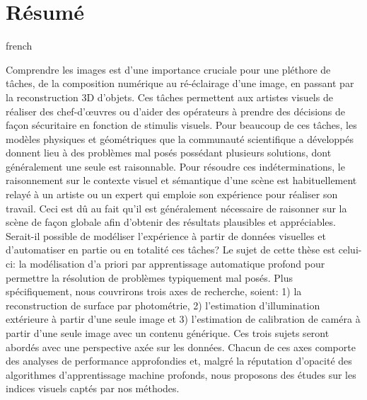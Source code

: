\chapter*{Résumé}                      %

\begin{otherlanguage*}{french}

Comprendre les images est d'une importance cruciale pour une pléthore de tâches, de la composition numérique au ré-éclairage d'une image, en passant par la reconstruction 3D d'objets. Ces tâches permettent aux artistes visuels de réaliser des chef-d'\oe{}uvres ou d'aider des opérateurs à prendre des décisions de façon sécuritaire en fonction de stimulis visuels. Pour beaucoup de ces tâches, les modèles physiques et géométriques que la communauté scientifique a développés donnent lieu à des problèmes mal posés possédant plusieurs solutions, dont généralement une seule est raisonnable. Pour résoudre ces indéterminations, le raisonnement sur le contexte visuel et sémantique d'une scène est habituellement relayé à un artiste ou un expert qui emploie son expérience pour réaliser son travail. Ceci est dû au fait qu'il est généralement nécessaire de raisonner sur la scène de façon globale afin d'obtenir des résultats plausibles et appréciables. Serait-il possible de modéliser l'expérience à partir de données visuelles et d'automatiser en partie ou en totalité ces tâches? Le sujet de cette thèse est celui-ci: la modélisation d'a priori par apprentissage automatique profond pour permettre la résolution de problèmes typiquement mal posés. Plus spécifiquement, nous couvrirons trois axes de recherche, soient: 1) la reconstruction de surface par photométrie, 2) l'estimation d'illumination extérieure à partir d'une seule image et 3) l'estimation de calibration de caméra à partir d'une seule image avec un contenu générique. Ces trois sujets seront abordés avec une perspective axée sur les données. Chacun de ces axes comporte des analyses de performance approfondies et, malgré la réputation d'opacité des algorithmes d'apprentissage machine profonds, nous proposons des études sur les indices visuels captés par nos méthodes. 

\end{otherlanguage*}
